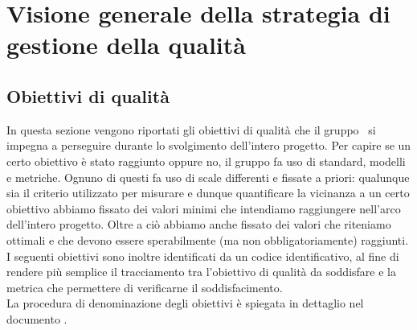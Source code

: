 \documentclass[../PianoDiQualifica.tex]{subfiles}
\begin{document}
\section{Visione generale della strategia di gestione della qualità}
	\subsection{Obiettivi di qualità}
	In questa sezione vengono riportati gli obiettivi di qualità che il gruppo \leaf\ si impegna a perseguire durante lo svolgimento dell'intero progetto. Per capire se un certo obiettivo è stato raggiunto oppure no, il gruppo fa uso di standard, modelli e metriche. Ognuno di questi fa uso di scale differenti e fissate a priori: qualunque sia il criterio utilizzato per misurare e dunque quantificare la vicinanza a un certo obiettivo abbiamo fissato dei valori minimi che intendiamo raggiungere nell'arco dell'intero progetto. Oltre a ciò abbiamo anche fissato dei valori che riteniamo ottimali e che devono essere sperabilmente (ma non obbligatoriamente) raggiunti.\\
	I seguenti obiettivi sono inoltre identificati da un codice identificativo, al fine di rendere più semplice il tracciamento tra l'obiettivo di qualità da soddisfare e la metrica che permettere di verificarne il soddisfacimento.\\
	La procedura di denominazione degli obiettivi è spiegata in dettaglio nel documento \normediprogettov.
	
\end{document}
